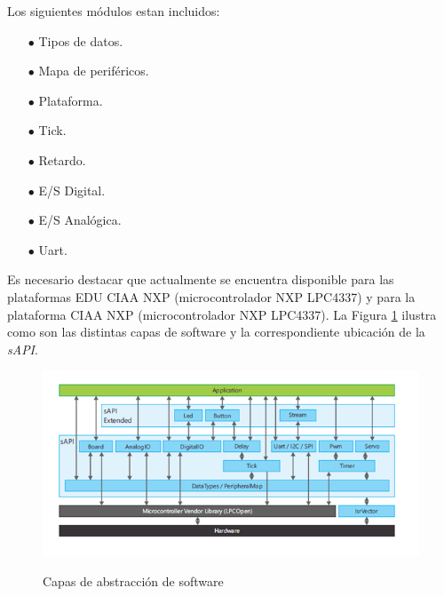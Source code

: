\documentclass[12pt,letterpaper]{article}
\begin{document}
Los siguientes módulos estan incluidos:
\begin{enumerate}
\item[$\bullet$]Tipos de datos.
\item[$\bullet$]Mapa de periféricos.
\item[$\bullet$]Plataforma.
\item[$\bullet$]Tick.
\item[$\bullet$]Retardo.
\item[$\bullet$]E/S Digital.
\item[$\bullet$]E/S Analógica.
\item[$\bullet$]Uart.
\end{enumerate}   

Es necesario destacar que actualmente se encuentra disponible para las plataformas EDU CIAA NXP (microcontrolador NXP LPC4337) y para la plataforma CIAA NXP (microcontrolador NXP LPC4337). La Figura \ref{Fig18} ilustra como son las distintas capas de software y la correspondiente ubicación de la \textit{sAPI}.
\begin{figure}[H]
\centering
\includegraphics[width=12 cm]{figuras/primer_proy18.png}\\
\caption{Capas de abstracción de software}
\label{Fig18}
\end{figure} 
\end{document}
